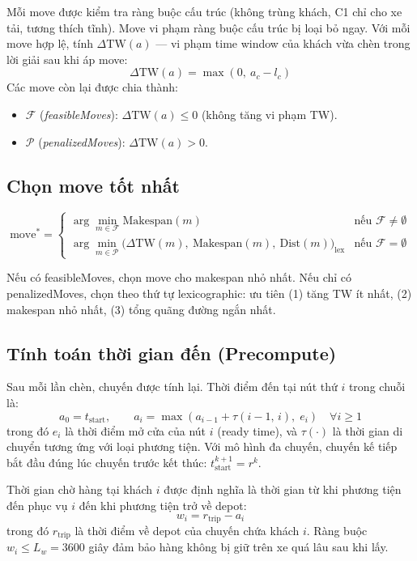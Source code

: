 \documentclass[../DoAn.tex]{subfiles}
\begin{document}
Mỗi move được kiểm tra ràng buộc cấu trúc (không trùng khách, C1 chỉ cho xe tải, tương thích tĩnh). Move vi phạm ràng buộc cấu trúc bị loại bỏ ngay. Với mỗi move hợp lệ, tính $\Delta\text{TW}(a)$ --- vi phạm time window của khách vừa chèn trong lời giải sau khi áp move:
\[
\Delta\text{TW}(a) = \max\!\left(0,\ a_c - l_c\right)
\]
Các move còn lại được chia thành:
\begin{itemize}
    \item $\mathcal{F}$ (\textit{feasibleMoves}): $\Delta\text{TW}(a) \leq 0$ (không tăng vi phạm TW).
    \item $\mathcal{P}$ (\textit{penalizedMoves}): $\Delta\text{TW}(a) > 0$.
\end{itemize}

\subsection{Chọn move tốt nhất}

\[
\text{move}^* = \begin{cases}
\displaystyle\arg\min_{m \in \mathcal{F}} \text{Makespan}(m) & \text{nếu } \mathcal{F} \neq \emptyset \\[6pt]
\displaystyle\arg\min_{m \in \mathcal{P}} \bigl(\Delta\text{TW}(m),\ \text{Makespan}(m),\ \text{Dist}(m)\bigr)_{\text{lex}} & \text{nếu } \mathcal{F} = \emptyset
\end{cases}
\]

Nếu có feasibleMoves, chọn move cho makespan nhỏ nhất. Nếu chỉ có penalizedMoves, chọn theo thứ tự lexicographic: ưu tiên (1) tăng TW ít nhất, (2) makespan nhỏ nhất, (3) tổng quãng đường ngắn nhất.

\subsection{Tính toán thời gian đến (Precompute)}

Sau mỗi lần chèn, chuyến được tính lại. Thời điểm đến tại nút thứ $i$ trong chuỗi là:
\[
a_0 = t_{\text{start}}, \qquad
a_i = \max\!\left(a_{i-1} + \tau(i{-}1,\, i),\; e_i\right) \quad \forall i \geq 1
\]
trong đó $e_i$ là thời điểm mở cửa của nút $i$ (ready time), và $\tau(\cdot)$ là thời gian di chuyển tương ứng với loại phương tiện. Với mô hình đa chuyến, chuyến kế tiếp bắt đầu đúng lúc chuyến trước kết thúc: $t^{k+1}_{\text{start}} = r^k$.

Thời gian chờ hàng tại khách $i$ được định nghĩa là thời gian từ khi phương tiện đến phục vụ $i$ đến khi phương tiện trở về depot:
\[
w_i = r_{\text{trip}} - a_i
\]
trong đó $r_{\text{trip}}$ là thời điểm về depot của chuyến chứa khách $i$. Ràng buộc $w_i \leq L_w = 3600$ giây đảm bảo hàng không bị giữ trên xe quá lâu sau khi lấy.
\end{document}
